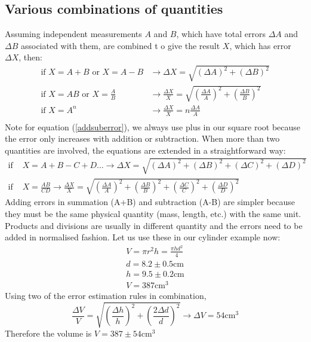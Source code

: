 \documentclass[class=report, crop=false, 12pt,a4paper]{standalone}
\begin{document}
\subsection{Various combinations of quantities}
Assuming independent measurements $A$ and $B$, which have total errors $\Delta A$ and $\Delta B$ associated with them, are combined t o give the result $X$, which has error $\Delta X$, then:
\begin{align}
  \textrm{if } X = A + B \textrm{ or } X = A - B &\longrightarrow \Delta X = \sqrt{(\Delta A)^2 + (\Delta B)^2}\\ \label{addsuberror}
  \textrm{if } X = AB \textrm{ or } X = \frac{A}{B} &\longrightarrow \frac{\Delta X}{X} = \sqrt{\left(\frac{\Delta A}{A}\right)^2 + \left(\frac{\Delta B}{B}\right)^2}\\
  \textrm{if } X = A^n &\longrightarrow \frac{\Delta X}{X} = n \frac{\Delta A}{A}\\
\end{align}
Note for equation (\ref{addsuberror}), we always use plus in our square root because the error only increases with addition or subtraction. When more than two quantities are involved, the equations are extended in a straightforward way: 
\begin{align}
  \textrm{if } &X = A + B - C + D ... \longrightarrow \Delta X = \sqrt{(\Delta A)^2 + (\Delta B)^2 + (\Delta C)^2 + (\Delta D)^2}\\
  \textrm{if } &X = \frac{AB}{CD} \longrightarrow \frac{\Delta X}{X} = \sqrt{\left(\frac{\Delta A}{A}\right)^2 + \left(\frac{\Delta B}{B}\right)^2 + \left(\frac{\Delta C}{C}\right)^2 + \left(\frac{\Delta D}{D}\right)^2}
\end{align}
Adding errors in summation (A+B) and subtraction (A-B) are simpler because they must be the same physical quantity (mass, length, etc.) with the same unit. Products and divisions are usually in different quantity and the errors need to be added in normalised fashion. Let us use these in our cylinder example now: 
\begin{gather}
  V = \pi r^2 h = \frac{\pi h d^2}{4}\\
  d = 8.2 \pm 0.5 \si{\centi\meter}\\
  h = 9.5 \pm 0.2 \si{\centi\meter}\\
  V = 387 \si{\centi\meter\cubed}
\end{gather}
Using two of the error estimation rules in combination,
\begin{equation}
  \frac{\Delta V}{V} = \sqrt{\left(\frac{\Delta h}{h}\right)^2 + \left(\frac{2\Delta d}{d}\right)^2} \longrightarrow \Delta V = 54 \si{\centi\meter\cubed}
\end{equation}
Therefore the volume is $V = 387 \pm 54 \si{\centi\meter\cubed}$
\end{document}
